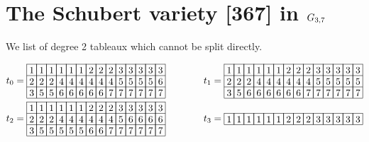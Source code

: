 \section{The Schubert variety [367] in $G_{{3},{7}}$}
\label{sec:sch367}

We list of degree 2 tableaux which cannot be split directly.

\begin{align*}
    &t_0 = 
\begin{array}[c]{*{14}c}\cline{1-14}
\lr{1}&\lr{1}&\lr{1}&\lr{1}&\lr{1}&\lr{1}&\lr{2}&\lr{2}&\lr{2}&\lr{3}&\lr{3}&\lr{3}&\lr{3}&\lr{3}\\\cline{1-14}
\lr{2}&\lr{2}&\lr{2}&\lr{4}&\lr{4}&\lr{4}&\lr{4}&\lr{4}&\lr{4}&\lr{5}&\lr{5}&\lr{5}&\lr{5}&\lr{6}\\\cline{1-14}
\lr{3}&\lr{5}&\lr{5}&\lr{6}&\lr{6}&\lr{6}&\lr{6}&\lr{6}&\lr{7}&\lr{7}&\lr{7}&\lr{7}&\lr{7}&\lr{7}\\\cline{1-14}
\end{array}\hspace{30pt}
    &t_1 = 
\begin{array}[c]{*{14}c}\cline{1-14}
\lr{1}&\lr{1}&\lr{1}&\lr{1}&\lr{1}&\lr{1}&\lr{2}&\lr{2}&\lr{2}&\lr{3}&\lr{3}&\lr{3}&\lr{3}&\lr{3}\\\cline{1-14}
\lr{2}&\lr{2}&\lr{2}&\lr{4}&\lr{4}&\lr{4}&\lr{4}&\lr{4}&\lr{4}&\lr{5}&\lr{5}&\lr{5}&\lr{5}&\lr{5}\\\cline{1-14}
\lr{3}&\lr{5}&\lr{6}&\lr{6}&\lr{6}&\lr{6}&\lr{6}&\lr{6}&\lr{7}&\lr{7}&\lr{7}&\lr{7}&\lr{7}&\lr{7}\\\cline{1-14}
\end{array}\\
    &t_2 = \begin{array}[c]{*{14}c}\cline{1-14}
\lr{1}&\lr{1}&\lr{1}&\lr{1}&\lr{1}&\lr{1}&\lr{2}&\lr{2}&\lr{2}&\lr{3}&\lr{3}&\lr{3}&\lr{3}&\lr{3}\\\cline{1-14}
\lr{2}&\lr{2}&\lr{2}&\lr{4}&\lr{4}&\lr{4}&\lr{4}&\lr{4}&\lr{4}&\lr{5}&\lr{6}&\lr{6}&\lr{6}&\lr{6}\\\cline{1-14}
\lr{3}&\lr{5}&\lr{5}&\lr{5}&\lr{5}&\lr{5}&\lr{6}&\lr{6}&\lr{7}&\lr{7}&\lr{7}&\lr{7}&\lr{7}&\lr{7}\\\cline{1-14}
\end{array}\hspace{30pt}
    &t_3 = \begin{array}[c]{*{14}c}\cline{1-14}
\lr{1}&\lr{1}&\lr{1}&\lr{1}&\lr{1}&\lr{1}&\lr{2}&\lr{2}&\lr{2}&\lr{3}&\lr{3}&\lr{3}&\lr{3}&\lr{3}\\\cline{1-14}

\end{array}
\end{align*}
